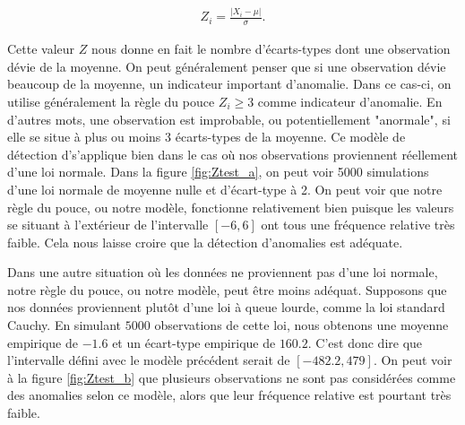 \begin{gather}
Z_i = \frac{|X_i-\mu|}{\sigma}.
\end{gather}

Cette valeur $Z$ nous donne en fait le nombre d'écarts-types dont une observation dévie de la moyenne. On peut généralement penser que si une observation dévie beaucoup de la moyenne, \DIFdelbegin {}\DIFdelend \DIFaddbegin {}\DIFaddend un indicateur important d'anomalie. Dans ce cas-ci, on utilise généralement la règle du pouce $Z_i \ge 3$ comme indicateur d'anomalie. En d'autres mots, une observation est improbable, ou potentiellement "anormale", si elle se situe à plus ou moins 3 écarts-types de la moyenne. Ce modèle de détection d'\DIFdelbegin {}\DIFdelend \DIFaddbegin {}\DIFaddend s'applique bien dans le cas où nos observations \DIFaddbegin {}\DIFaddend proviennent réellement \DIFaddbegin {}\DIFaddend d'une \DIFaddbegin {}\DIFaddend loi normale. Dans la figure \ref{fig:Ztest_a}, on peut voir 5000 simulations d'une loi normale de moyenne nulle et d'écart-type \DIFdelbegin {}\DIFdelend \DIFaddbegin {}\DIFaddend à 2. On peut voir que notre règle du pouce, ou notre modèle, fonctionne relativement bien puisque les valeurs se situant à l'extérieur de l'intervalle $[-6, 6]$ ont tous une fréquence relative très faible. \DIFdelbegin {}\DIFdelend Cela nous laisse croire que la détection d'anomalies est adéquate. 
\DIFaddbegin 

\DIFaddend Dans une autre situation où les données ne proviennent pas d'une loi normale, notre règle du pouce, ou notre modèle, peut être moins adéquat. Supposons que nos données proviennent plutôt d'une loi à queue lourde, comme la loi standard Cauchy. En simulant $5000$ observations de cette loi, nous obtenons une moyenne empirique de $-1.6$ et un écart-type empirique de $160.2$. C'est donc dire que l'intervalle défini avec le modèle précédent serait de $[-482.2, 479]$. On peut voir à la figure \ref{fig:Ztest_b} que plusieurs observations ne sont pas considérées comme des anomalies selon ce modèle, alors que leur fréquence relative est pourtant très faible\DIFdelbegin {}\DIFdelend .


